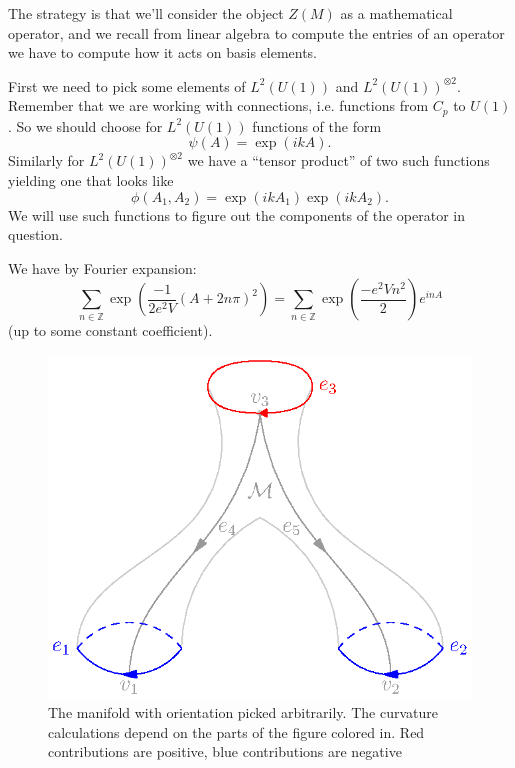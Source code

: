 \documentclass{amsart}
\numberwithin{equation}{section}
\begin{document}
The strategy is that we'll consider the object $Z(M)$ as a
mathematical operator, and we recall from linear algebra to
compute the entries of an operator we have to compute how it acts
on basis elements. 

First we need to pick some elements of $L^{2}(U(1))$ and
$L^{2}(U(1))^{\otimes 2}$. Remember that we are working
with connections, i.e. functions from $C_{p}$ to $U(1)$. So we
should choose for $L^{2}(U(1))$ functions of the form
\begin{equation}%
\psi(A) = \exp(ikA).
\end{equation}
Similarly for $L^{2}(U(1))^{\otimes 2}$ we have a
``tensor product'' of two such functions yielding one that looks
like
\begin{equation}%
\phi(A_{1},A_{2}) = \exp(ikA_{1})\exp(ikA_{2}).
\end{equation}
We will use such functions to figure out the components of the
operator in question.

\begin{prop}\label{prop:fourierExpansionThetaFunction}
We have by Fourier expansion:
\begin{equation}%
\sum_{n\in\mathbb{Z}}\exp\left(\frac{-1}{2e^{2}V}(A+2n\pi)^{2}\right)
= \sum_{n\in\mathbb{Z}}\exp\left(\frac{-e^{2}Vn^{2}}{2}\right)e^{inA}
\end{equation}
(up to some constant coefficient).
\end{prop}

\begin{figure}[t]
\includegraphics{img/img4.eps}
\caption{The manifold with orientation picked arbitrarily. The
  curvature calculations depend on the parts of the figure
  colored in. Red contributions are positive, blue contributions
  are negative}\label{fig:img4}
\end{figure}
\end{document}
